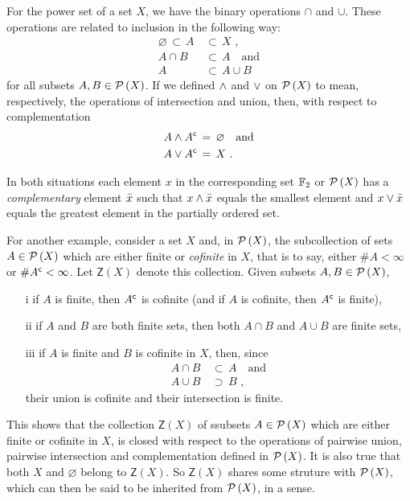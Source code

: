 For the power set of a set $X$, we have the binary operations $\cap$ and $\cup$.
These operations are related to inclusion in the following way:
\begin{align*}
	\varnothing \,\subset\, A & \,\subset\, X \text{ ,} \\
	A\cap B & \,\subset\, A \quad\text{and} \\
	A & \,\subset\, A\cup B
\end{align*}
%
for all subsets $A,B\in\mathcal{P}\left(X\right)$. If we defined $\wedge$ and $\vee$
on $\mathcal{P}\left(X\right)$ to mean, respectively, the operations of intersection and
union, then, with respect to complementation
\begin{align*}
	A\wedge {A}^{\mathsf{c}} & \,=\, \varnothing \quad\text{and} \\
	A\vee {A}^{\mathsf{c}} & \,=\, X \text{ .}
\end{align*}
%

In both situations each element $x$ in the corresponding set $\mathbb{F}_{2}$ or
$\mathcal{P}\left(X\right)$ has a \emph{complementary} element $\bar{x}$ such that
$x\wedge\bar{x}$ equals the smallest element and $x\vee\bar{x}$
equals the greatest element in the partially ordered set.

For another example, consider a set $X$ and, in $\mathcal{P}\left(X\right)$, the
subcollection of sets $A\in\mathcal{P}\left(X\right)$ which are either finite or
\emph{cofinite} in $X$, that is to say, either $\# A<\infty$ or
$\# {A}^{\mathsf{c}}<\infty$. Let $\mathsf{Z}(X)$ denote this collection.
Given subsets $A,B\in\mathcal{P}\left(X\right)$,
\begin{itemize}
	\item[i] if $A$ is finite, then ${A}^{\mathsf{c}}$ is cofinite
		(and if $A$ is cofinite, then ${A}^{\mathsf{c}}$ is finite),
	\item[ii] if $A$ and $B$ are both finite sets, then both
		$A\cap B$ and $A\cup B$ are finite sets,
	\item[iii] if $A$ is finite and $B$ is cofinite in $X$, then, since
		\begin{align*}
			A\cap B & \,\subset\, A \quad\text{and} \\
			A\cup B & \,\supset\, B \text{ ,}
		\end{align*}
		their union is cofinite and their intersection is finite.
\end{itemize}
This shows that the collection $\mathsf{Z}(X)$ of ssubsets $A\in\mathcal{P}\left(X\right)$
which are either finite or cofinite in $X$, is closed with respect to the
operations of pairwise union, pairwise intersection and complementation
defined in $\mathcal{P}\left(X\right)$. It is also true that both $X$ and $\varnothing$
belong to $\mathsf{Z}(X)$. So $\mathsf{Z}(X)$ shares some struture with
$\mathcal{P}\left(X\right)$, which can then be said to be inherited from $\mathcal{P}\left(X\right)$,
in a sense.


